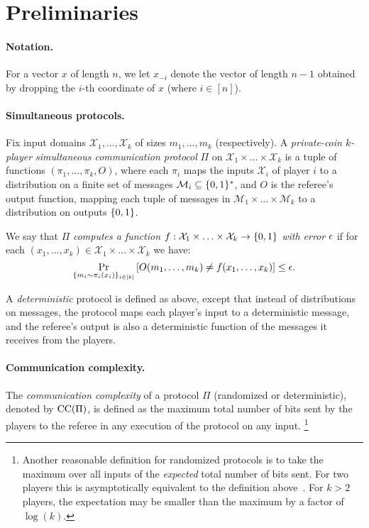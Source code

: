 \section{Preliminaries}
\label{sec:prelim}

\paragraph{Notation.}
For a vector $x$ of length $n$, we let $x_{-i}$ denote the vector of length $n-1$ obtained by dropping the $i$-th coordinate of $x$ (where $i \in [n]$).

\paragraph{Simultaneous protocols.}

Fix input domains $\mathcal{X}_1,\ldots,\mathcal{X}_k$ of sizes $m_1,\ldots,m_k$ (respectively).
A \emph{private-coin $k$-player simultaneous communication protocol} $\Pi$ on $\mathcal{X}_1 \times \ldots \times \mathcal{X}_k$
is a tuple of functions $(\pi_1,\ldots,\pi_k, O)$,
where each $\pi_i$ maps the inputs $\mathcal{X}_i$ of player $i$ to a distribution on a finite set of messages $\mathcal{M}_i \subseteq \{ 0,1 \}^*$,
and $O$ is the referee's output function, mapping each tuple of messages in $\mathcal{M}_1 \times \ldots \times \mathcal{M}_k$ to a distribution on outputs $\{ 0,1 \}$.

We say that $\Pi$ \emph{computes a function $f: \mathcal{X}_1 \times \ldots \times \mathcal{X}_k \rightarrow \{ 0,1 \}$ with error $\epsilon$}
if for each $(x_1,\ldots,x_k) \in \mathcal{X}_1 \times \ldots \times \mathcal{X}_k$ we have:
\begin{equation*}
	\Pr_{ \{ m_i \sim \pi_i(x_i) \}_{i \in [k]}}\left[ O(m_1,\ldots,m_k) \neq f(x_1,\ldots,x_k) \right] \leq \epsilon.
\end{equation*}

A \emph{deterministic} protocol is defined as above, except that instead of distributions on messages, the protocol maps each player's input to a deterministic message, and the referee's output is also a deterministic function of the messages it receives from the players.

\paragraph{Communication complexity.}
The \emph{communication complexity} of a protocol $\Pi$ (randomized or deterministic), denoted by $\mathrm{CC}(\Pi)$, is defined as the maximum total number of bits
sent by the players to the referee in any execution of the protocol on any input.%
\footnote{Another reasonable definition for randomized protocols is to take the maximum over all inputs of the \emph{expected} total number of bits sent. For two players this is asymptotically equivalent to the definition above~\cite{KN96}. For $k > 2$ players, the expectation may be smaller than the maximum by a factor of $\log(k)$.}

